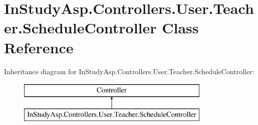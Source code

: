 \hypertarget{class_in_study_asp_1_1_controllers_1_1_user_1_1_teacher_1_1_schedule_controller}{}\section{In\+Study\+Asp.\+Controllers.\+User.\+Teacher.\+Schedule\+Controller Class Reference}
\label{class_in_study_asp_1_1_controllers_1_1_user_1_1_teacher_1_1_schedule_controller}
Inheritance diagram for In\+Study\+Asp.\+Controllers.\+User.\+Teacher.\+Schedule\+Controller\+:\begin{figure}[H]
\begin{center}
\leavevmode
\includegraphics[height=2.000000cm]{class_in_study_asp_1_1_controllers_1_1_user_1_1_teacher_1_1_schedule_controller}
\end{center}
\end{figure}
